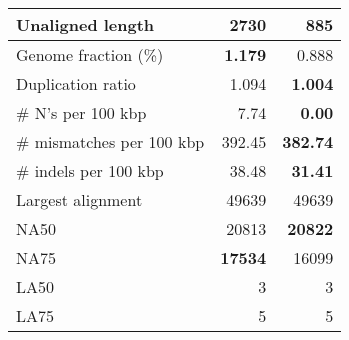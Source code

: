 \documentclass[12pt,a4paper]{article}
\begin{document}
\begin{table}[ht]
\begin{center}
\begin{tabular}{|l*{2}{|r}|}
Unaligned length & 2730 & {\bf 885} \\ \hline
Genome fraction (\%) & {\bf 1.179} & 0.888 \\ \hline
Duplication ratio & 1.094 & {\bf 1.004} \\ \hline
\# N's per 100 kbp & 7.74 & {\bf 0.00} \\ \hline
\# mismatches per 100 kbp & 392.45 & {\bf 382.74} \\ \hline
\# indels per 100 kbp & 38.48 & {\bf 31.41} \\ \hline
Largest alignment & 49639 & 49639 \\ \hline
NA50 & 20813 & {\bf 20822} \\ \hline
NA75 & {\bf 17534} & 16099 \\ \hline
LA50 & 3 & 3 \\ \hline
LA75 & 5 & 5 \\ \hline
\end{tabular}
\end{center}
\end{table}
\end{document}
